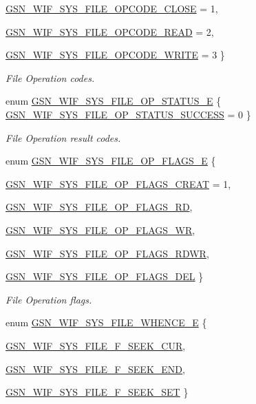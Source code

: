 \begin{DoxyCompactItemize}
\hyperlink{a00639_gga24ebbde6925db9b03e4648c99be320b4a8fda2104e936080f682793861eed2af2}{GSN\_\-WIF\_\-SYS\_\-FILE\_\-OPCODE\_\-CLOSE} =  1, 
\par
\hyperlink{a00639_gga24ebbde6925db9b03e4648c99be320b4a80cebc45da04e421658eb57baa0b75df}{GSN\_\-WIF\_\-SYS\_\-FILE\_\-OPCODE\_\-READ} =  2, 
\par
\hyperlink{a00639_gga24ebbde6925db9b03e4648c99be320b4a000e53ca67ec09e29f77da0415fe675e}{GSN\_\-WIF\_\-SYS\_\-FILE\_\-OPCODE\_\-WRITE} =  3
 \}
\begin{DoxyCompactList}\small\item\em File Operation codes. \end{DoxyCompactList}\item 
enum \hyperlink{a00639_ga4ab9f7b6980d4b5c3f3a0199250b8923}{GSN\_\-WIF\_\-SYS\_\-FILE\_\-OP\_\-STATUS\_\-E} \{ \hyperlink{a00639_gga4ab9f7b6980d4b5c3f3a0199250b8923a8f28cfe76fca5043418aaa6eaeec9e0a}{GSN\_\-WIF\_\-SYS\_\-FILE\_\-OP\_\-STATUS\_\-SUCCESS} =  0
 \}
\begin{DoxyCompactList}\small\item\em File Operation result codes. \end{DoxyCompactList}\item 
enum \hyperlink{a00639_gac5b276b2a9ea66f27afb0f35e0e75257}{GSN\_\-WIF\_\-SYS\_\-FILE\_\-OP\_\-FLAGS\_\-E} \{ \par
\hyperlink{a00639_ggac5b276b2a9ea66f27afb0f35e0e75257a70c4828a84c7b58dbd61131c8bebfb1a}{GSN\_\-WIF\_\-SYS\_\-FILE\_\-OP\_\-FLAGS\_\-CREAT} =  1, 
\par
\hyperlink{a00639_ggac5b276b2a9ea66f27afb0f35e0e75257a3e3b02fa7233e93586c27fd95a8395aa}{GSN\_\-WIF\_\-SYS\_\-FILE\_\-OP\_\-FLAGS\_\-RD}, 
\par
\hyperlink{a00639_ggac5b276b2a9ea66f27afb0f35e0e75257a0afd71ef921c94f1b97cf8722f9235a4}{GSN\_\-WIF\_\-SYS\_\-FILE\_\-OP\_\-FLAGS\_\-WR}, 
\par
\hyperlink{a00639_ggac5b276b2a9ea66f27afb0f35e0e75257aea0bd02aef90199065c6bbe0d4c84c21}{GSN\_\-WIF\_\-SYS\_\-FILE\_\-OP\_\-FLAGS\_\-RDWR}, 
\par
\hyperlink{a00639_ggac5b276b2a9ea66f27afb0f35e0e75257acaacf27fc6f8dbce410f3651a6d9952c}{GSN\_\-WIF\_\-SYS\_\-FILE\_\-OP\_\-FLAGS\_\-DEL}
 \}
\begin{DoxyCompactList}\small\item\em File Operation flags. \end{DoxyCompactList}\item 
enum \hyperlink{a00612_a7df5e29e60c1b277e846cfb371ab25f0}{GSN\_\-WIF\_\-SYS\_\-FILE\_\-WHENCE\_\-E} \{ \par
\hyperlink{a00612_a7df5e29e60c1b277e846cfb371ab25f0a0b4a7ba0d5fc35fdaa20582eef6eaf85}{GSN\_\-WIF\_\-SYS\_\-FILE\_\-F\_\-SEEK\_\-CUR}, 
\par
\hyperlink{a00612_a7df5e29e60c1b277e846cfb371ab25f0a4d89b7d65d9896e62767c6da830ec1ba}{GSN\_\-WIF\_\-SYS\_\-FILE\_\-F\_\-SEEK\_\-END}, 
\par
\hyperlink{a00612_a7df5e29e60c1b277e846cfb371ab25f0a08719b66803a416593d3363af117e05e}{GSN\_\-WIF\_\-SYS\_\-FILE\_\-F\_\-SEEK\_\-SET}
 \}
\end{DoxyCompactItemize}


